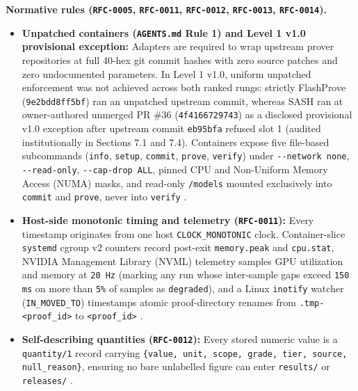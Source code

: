 \documentclass[11pt,letterpaper]{article}
\begin{document}
\textbf{Normative rules (\texttt{RFC-0005}, \texttt{RFC-0011}, \texttt{RFC-0012}, \texttt{RFC-0013}, \texttt{RFC-0014}).}

\begin{itemize}
\item \textbf{Unpatched containers (\texttt{AGENTS.\allowbreak{}md} Rule 1) and Level 1 v1.0 provisional exception:} Adapters are required to wrap upstream prover repositories at full 40-hex git commit hashes with zero source patches and zero undocumented parameters. In Level 1 v1.0, uniform unpatched enforcement was not achieved across both ranked rungs: strictly FlashProve (\texttt{9e2bdd8ff5bf}) ran an unpatched upstream commit, whereas SASH ran at owner-authored unmerged PR \#36 (\texttt{4f4166729743}) as a disclosed provisional v1.0 exception after upstream commit \texttt{eb95bfa} refused slot 1 (audited institutionally in Sections 7.1 and 7.4). Containers expose five file-based subcommands (\texttt{info}, \texttt{setup}, \texttt{commit}, \texttt{prove}, \texttt{verify}) under \texttt{-{}-network none}, \texttt{-{}-read-\allowbreak{}only}, \texttt{-{}-cap-\allowbreak{}drop ALL}, pinned CPU and Non-Uniform Memory Access (NUMA) masks, and read-only \texttt{/\allowbreak{}models} mounted exclusively into \texttt{commit} and \texttt{prove}, never into \texttt{verify} \cite{iproofs2026}.
\item \textbf{Host-side monotonic timing and telemetry (\texttt{RFC-0011}):} Every timestamp originates from one host \texttt{CLOCK\_\allowbreak{}MONOTONIC} clock. Container-slice \texttt{systemd} cgroup v2 counters record post-exit \texttt{memory.\allowbreak{}peak} and \texttt{cpu.\allowbreak{}stat}, NVIDIA Management Library (NVML) telemetry samples GPU utilization and memory at \texttt{20 Hz} (marking any run whose inter-sample gaps exceed \texttt{150 ms} on more than \texttt{5\%} of samples as \texttt{degraded}), and a Linux \texttt{inotify} watcher (\texttt{IN\_\allowbreak{}MOVED\_\allowbreak{}TO}) timestamps atomic proof-directory renames from \texttt{.\allowbreak{}tmp-<proof\_\allowbreak{}id>} to \texttt{<proof\_\allowbreak{}id>} \cite{iproofs2026}.
\item \textbf{Self-describing quantities (\texttt{RFC-0012}):} Every stored numeric value is a \texttt{quantity/\allowbreak{}1} record carrying \texttt{\{value, unit, scope, grade, tier, source, null\_\allowbreak{}reason\}}, ensuring no bare unlabelled figure can enter \texttt{results/} or \texttt{releases/} \cite{iproofs2026}.

\end{itemize}
\end{document}
